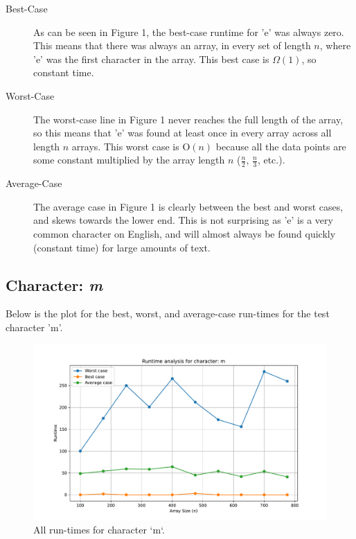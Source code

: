 \documentclass{article}
\begin{document}
\begin{description}
    \item[Best-Case] As can be seen in Figure 1, the best-case runtime for 'e' was always zero. This means that there was always an array, in every set of length $n$, where 'e' was the first character in the array. This best case is $\Omega(1)$, so constant time.
    \item[Worst-Case] The worst-case line in Figure 1 never reaches the full length of the array, so this means that 'e' was found at least once in every array across all length $n$ arrays. This worst case is O$(n)$ because all the data points are some constant multiplied by the array length $n$ ($\frac{n}{2}$, $\frac{n}{3}$, etc.).
    \item[Average-Case] The average case in Figure 1 is clearly between the best and worst cases, and skews towards the lower end. This is not surprising as 'e' is a very common character on English, and will almost always be found quickly (constant time) for large amounts of text. 
\end{description}

\subsection{Character: \textit{m}}
Below is the plot for the best, worst, and average-case run-times for the test character 'm'.
	
	\begin{figure}[H]
		\centering
		\includegraphics[width=\textwidth]{runtime_analysis_m.pdf}
		\caption{All run-times for character `m`.}
	\end{figure}
\end{document}
